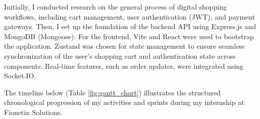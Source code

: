 \documentclass[12pt,a4paper]{report}
\begin{document}
Initially, I conducted research on the general process of digital shopping workflows, including cart management, user authentication (JWT), and payment gateways. Then, I set up the foundation of the backend API using Express.js and MongoDB (Mongoose). For the frontend, Vite and React were used to bootstrap the application. Zustand was chosen for state management to ensure seamless synchronization of the user's shopping cart and authentication state across components. Real-time features, such as order updates, were integrated using Socket.IO.

The timeline below (Table \ref{fig:gantt_chart}) illustrates the structured chronological progression of my activities and sprints during my internship at Fionetix Solutions.

\begin{table}[htbp]
\centering
\caption{Gantt Chart of the Proposed E-Commerce Project Timeline}
\label{fig:gantt_chart}
\end{table}
\end{document}
